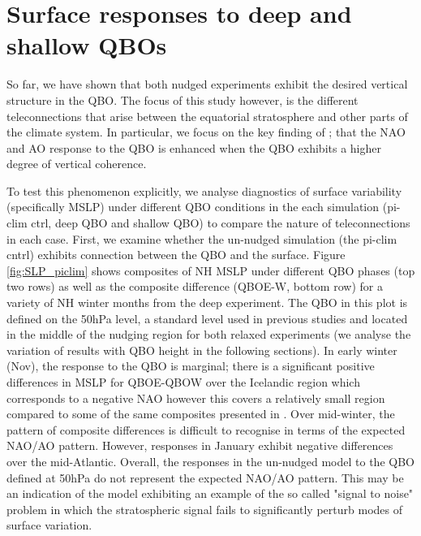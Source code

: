 

\section{Surface responses to deep and shallow QBOs}
\label{sec:vortex_responses_QBO}
So far, we have shown that both nudged experiments exhibit the desired vertical structure in the QBO. The focus of this study however, is the different teleconnections that arise between the equatorial stratosphere and other parts of the climate system. In particular, we focus on the key finding of \cite{andrewsObserved2019d}; that the NAO and AO response to the QBO is enhanced when the QBO exhibits a higher degree of vertical coherence. 

To test this phenomenon explicitly, we analyse  diagnostics of surface variability (specifically MSLP) under different QBO conditions in the each simulation (pi-clim ctrl, deep QBO and shallow QBO) to compare the nature of teleconnections in each case. First, we examine whether the un-nudged simulation (the pi-clim cntrl) exhibits connection between the QBO and the surface. Figure \ref{fig:SLP_piclim} shows composites of NH MSLP under different QBO phases (top two rows) as well as the composite difference (QBOE-W, bottom row) for a variety of NH winter months from the deep experiment. The QBO in this plot is defined on the 50hPa level, a standard level used in previous studies \citep{ansteyHighlatitude2014b} and located in the middle of the nudging region for both relaxed experiments (we analyse the variation of results with QBO height in the following sections). In early winter (Nov), the response to the QBO is marginal; there is a significant positive differences in MSLP for QBOE-QBOW over the Icelandic region which corresponds to a negative NAO however this covers a relatively small region compared to some of the same composites presented in \cite{andrewsObserved2019d}. Over mid-winter, the pattern of composite differences is difficult to recognise in terms of the expected NAO/AO pattern. However, responses in January exhibit negative differences over the mid-Atlantic. Overall, the responses in the un-nudged model to the QBO defined at 50hPa do not represent the expected NAO/AO pattern. This may be an indication of the model exhibiting an example of the so called "signal to noise" problem \citep{scaifeSignaltonoise2018b} in which the stratospheric signal fails to significantly perturb modes of surface variation. 

